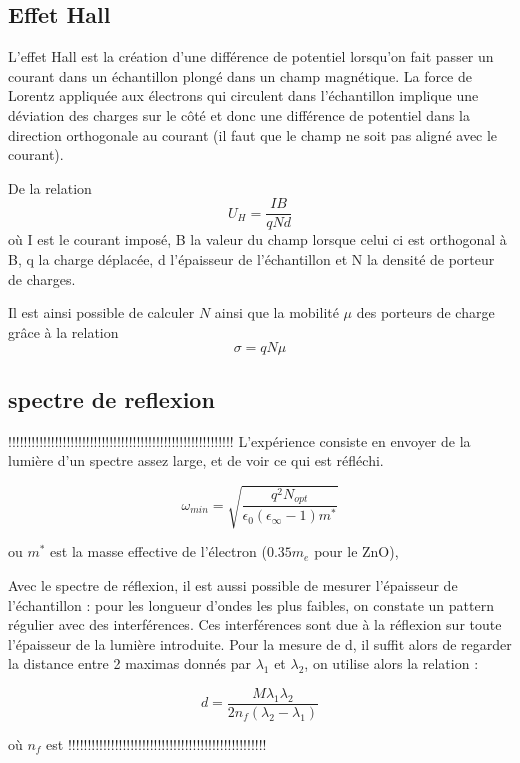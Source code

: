 \documentclass[a4paper,12pt,oneside]{article}
\def \be {\begin{equation}}
\def \ee {\end{equation}}
\begin{document}
\subsection{Effet Hall}
	L'effet Hall est la création d'une différence de potentiel lorsqu'on fait passer un courant dans un échantillon plongé dans un champ magnétique. La force de Lorentz appliquée aux électrons qui circulent dans l'échantillon implique une déviation des charges sur le côté et donc une différence de potentiel dans la direction orthogonale au courant (il faut que le champ ne soit pas aligné avec le courant).

	De la relation
	\be
		U_H = \frac{IB}{qNd}
	\ee
	où I est le courant imposé, B la valeur du champ lorsque celui ci est orthogonal à B, q la charge déplacée, d l'épaisseur de l'échantillon et N la densité de porteur de charges.

	Il est ainsi possible de calculer $N$ ainsi que la mobilité $\mu$ des porteurs de charge grâce à la relation
	\be
		\sigma = q N \mu
	\ee

\subsection{spectre de reflexion}
!!!!!!!!!!!!!!!!!!!!!!!!!!!!!!!!!!!!!!!!!!!!!!!!!!!!!!!!!!
L'expérience consiste en envoyer de la lumière d'un spectre assez large, et de voir ce qui est réfléchi.

\be
	\omega_{min}=\sqrt{ \frac{q^2 N_{opt}} {\epsilon_0(\epsilon_\infty-1)m^*} }
\ee

ou $m^*$ est la masse effective de l'électron ($0.35 m_e$ pour le ZnO),





Avec le spectre de réflexion, il est aussi possible de mesurer l'épaisseur de l'échantillon : pour les longueur d'ondes les plus faibles, on constate un pattern régulier avec des interférences. Ces interférences sont due à la réflexion sur toute l'épaisseur de la lumière introduite. Pour la mesure de d, il suffit alors de regarder la distance entre 2 maximas donnés par $\lambda_1$ et $\lambda_2$, on utilise alors la relation :

\be
	d=\frac{M\lambda_1 \lambda_2}{2 n_f (\lambda_2 - \lambda_1)}
\ee


où $n_f$ est !!!!!!!!!!!!!!!!!!!!!!!!!!!!!!!!!!!!!!!!!!!!!!!!!!!

\end{document}
